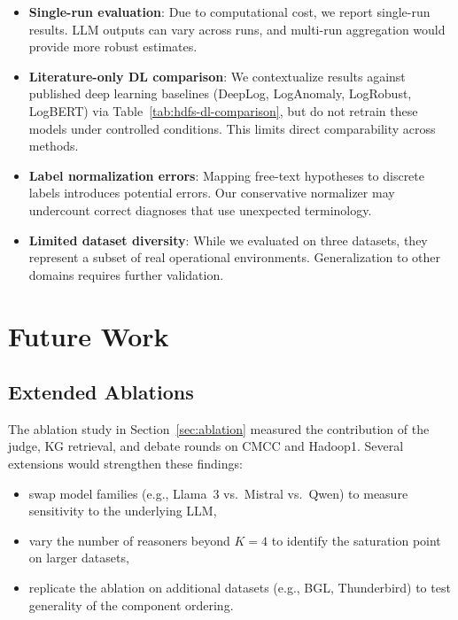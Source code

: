 \begin{itemize}
  \item \textbf{Single-run evaluation}: Due to computational cost, we report single-run results.
        LLM outputs can vary across runs, and multi-run aggregation would provide more robust
        estimates.

  \item \textbf{Literature-only DL comparison}: We contextualize results against published
        deep learning baselines (DeepLog, LogAnomaly, LogRobust, LogBERT) via
        Table~\ref{tab:hdfs-dl-comparison}, but do not retrain these models under controlled
        conditions. This limits direct comparability across methods.

  \item \textbf{Label normalization errors}: Mapping free-text hypotheses to discrete labels
        introduces potential errors. Our conservative normalizer may undercount correct diagnoses
        that use unexpected terminology.

  \item \textbf{Limited dataset diversity}: While we evaluated on three datasets, they represent
        a subset of real operational environments. Generalization to other domains requires
        further validation.
\end{itemize}

\section{Future Work}

\subsection{Extended Ablations}
The ablation study in Section~\ref{sec:ablation} measured the contribution of the judge,
KG retrieval, and debate rounds on CMCC and Hadoop1. Several extensions would strengthen
these findings:
\begin{itemize}
  \item swap model families (e.g., Llama~3 vs.\ Mistral vs.\ Qwen) to measure sensitivity
        to the underlying LLM,
  \item vary the number of reasoners beyond $K{=}4$ to identify the saturation point on
        larger datasets,
  \item replicate the ablation on additional datasets (e.g., BGL, Thunderbird) to test
        generality of the component ordering.
\end{itemize}

